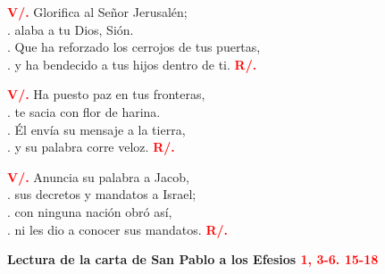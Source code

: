 \documentclass[12pt, letterpaper]{report}
\begin{document}
{\bfseries \textcolor{red}{V/.}} \hspace{1cm} Glorifica al Se\~nor Jerusal\'en; \\
. \hspace{2.3cm} alaba a tu Dios, Si\'on. \\
. \hspace{2.3cm} Que ha reforzado los cerrojos de tus puertas, \\
. \hspace{2.3cm} y ha bendecido a tus hijos dentro de ti. \hspace{1cm} {\bfseries \textcolor{red}{R/.}} \newline

{\bfseries \textcolor{red}{V/.}} \hspace{1cm} Ha puesto paz en tus fronteras, \\
. \hspace{2.3cm} te sacia con flor de harina. \\
. \hspace{2.3cm} \'El env\'ia su mensaje a la tierra, \\
. \hspace{2.3cm} y su palabra corre veloz. \hspace{1cm} {\bfseries \textcolor{red}{R/.}} \newline

{\bfseries \textcolor{red}{V/.}} \hspace{1cm} Anuncia su palabra a Jacob, \\
. \hspace{2.3cm} sus decretos y mandatos a Israel; \\
. \hspace{2.3cm} con ninguna naci\'on obr\'o as\'i, \\
. \hspace{2.3cm} ni les dio a conocer sus mandatos. \hspace{1cm} {\bfseries \textcolor{red}{R/.}}

\newpage

\Large {\bfseries Lectura de la carta de San Pablo a los Efesios \hspace{1cm} \textcolor{red}{1, 3-6. 15-18}} \newline
\end{document}
